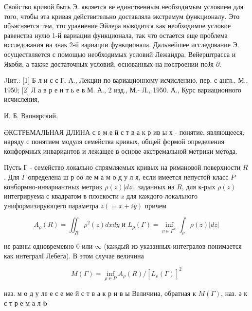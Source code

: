 \documentclass[10pt]{article}
\begin{document}
Свойство кривой быть Э. является ве единственным необходимым условием для того, чтобы эта кривая действительно доставляла экстремум функционалу. Это объясняется тем, тто уравнение Эйлера выводится как необходимое условие равенства нулю 1-й вариации функционала, так что остается еще проблема исследования на знак 2-й вариации функционала. Дальнейшее исследование Э. осуществляется с помощыо необходимых условий Лежандра, Вейерштрасса и Якоби, а также достаточных условий, основанных на ностроении поЈя $\partial$.



JIит.: [1] Б л и с с Г. А., Лекции по вариационному исчислению, пер. с англ., М., 1950; [2] Л а в р е н т ь е в М. А., 2 изд., М.- Л., 1950. А., Курс вариационного исчисления,

И. Б. Вапнярский.



ӘКСТРЕМАЛЬНАЯ ДЛИНА с е м е й с т в а к р ив ы х - понятие, являющееся, наряду с понятием модуля семейства кривых, общей формой определения конформных инвариантов и лежащее в основе әкстремальной метрики метода.



Пусть Г - семейство локально спрямляемых кривых на римановой поверхности $R$. Для $\Gamma$ определена ш р оӧ ле м а м о д у л я, если имеется непустой класс $P$ конбормно-инвариантных метрик $\rho(z)|d z|$, заданных на $R$, для к-рых $\rho(z)$ интегрируема с квадратом в плоскости $z$ для каждого локального униформизирующего параметра $z(=x+i y)$ причем



\[

A_{\rho}(R)=\iint_{R} \rho^{2}(z) d x d y \text { и } L_{\rho}(\Gamma)=\inf _{\nu \in \Gamma^{\mathbf{T}}} \int_{\nu} \rho(z)|d z|

\]



не равны одновремевно 0 или $\infty$ (каждый из указанных интегралов понимается как интегралІ Лебега). В этом случае величина



\[

M(\Gamma)=\inf _{\rho \in P} A_{\rho}(R) /\left[L_{\rho}(\Gamma)\right]^{2}

\]



наз. м о д у ле е с е ме й с т в а к р и в ы Величина, обратная к $M(\Gamma)$, наз. ә к с т р е м а л $\mathbf{b}^{-}$
\end{document}
